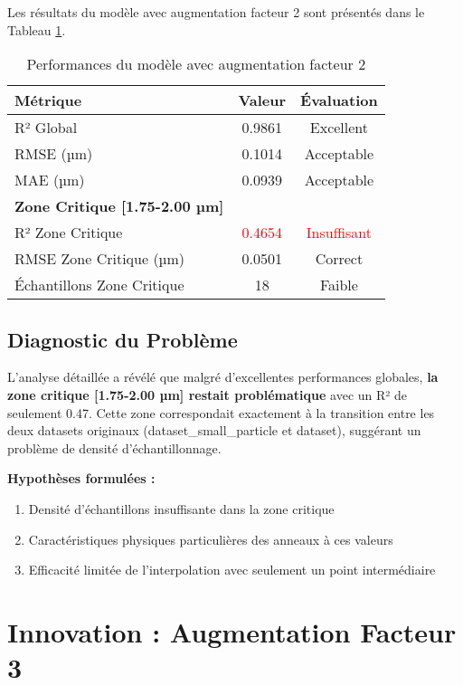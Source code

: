 \documentclass[11pt,a4paper,twocolumn]{article}
\begin{document}
Les résultats du modèle avec augmentation facteur 2 sont présentés dans le Tableau \ref{tab:factor2}.

\begin{table}[H]
\centering
\caption{Performances du modèle avec augmentation facteur 2}
\label{tab:factor2}
\begin{tabular}{@{}lcc@{}}
\toprule
\textbf{Métrique} & \textbf{Valeur} & \textbf{Évaluation} \\
\midrule
R² Global & 0.9861 & Excellent \\
RMSE (µm) & 0.1014 & Acceptable \\
MAE (µm) & 0.0939 & Acceptable \\
\textbf{Zone Critique [1.75-2.00 µm]} & & \\
R² Zone Critique & \textcolor{red}{0.4654} & \textcolor{red}{Insuffisant} \\
RMSE Zone Critique (µm) & 0.0501 & Correct \\
Échantillons Zone Critique & 18 & Faible \\
\bottomrule
\end{tabular}
\end{table}

\subsection{Diagnostic du Problème}

L'analyse détaillée a révélé que malgré d'excellentes performances globales, \textbf{la zone critique [1.75-2.00 µm] restait problématique} avec un R² de seulement 0.47. Cette zone correspondait exactement à la transition entre les deux datasets originaux (dataset\_small\_particle et dataset), suggérant un problème de densité d'échantillonnage.

\textbf{Hypothèses formulées :}
\begin{enumerate}
    \item Densité d'échantillons insuffisante dans la zone critique
    \item Caractéristiques physiques particulières des anneaux à ces valeurs
    \item Efficacité limitée de l'interpolation avec seulement un point intermédiaire
\end{enumerate}

\section{Innovation : Augmentation Facteur 3}
\end{document}
